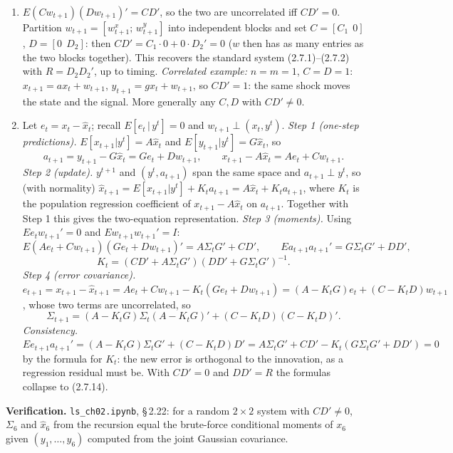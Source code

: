 \documentclass[12pt, letterpaper]{article}
\newcommand{\nb}[1]{\texttt{ls\_ch02.ipynb}, \S\,#1}
\begin{document}
\begin{tcolorbox}[evenbox,title={Exercise 2.22 \quad Kalman Filter with Cross-Products}]
\begin{enumerate}
\item $E(Cw_{t+1})(Dw_{t+1})'=CD'$, so the two are uncorrelated iff $CD'=0$. Partition
$w_{t+1}=[w^x_{t+1};\,w^y_{t+1}]$ into independent blocks and set $C=[C_1\ \ 0]$, $D=[0\ \ D_2]$: then
$CD'=C_1\cdot0+0\cdot D_2'=0$ ($w$ then has as many entries as the two blocks together). This
recovers the standard system (2.7.1)--(2.7.2) with $R=D_2D_2'$, up to timing.
\emph{Correlated example:} $n=m=1$, $C=D=1$: $x_{t+1}=ax_t+w_{t+1}$, $y_{t+1}=gx_t+w_{t+1}$, so
$CD'=1$: the same shock moves the state and the signal. More generally any $C,D$ with $CD'\neq0$.
\item Let $e_t=x_t-\hat x_t$; recall $E[e_t\,|\,y^t]=0$ and $w_{t+1}\perp(x_t,y^t)$.
\emph{Step 1 (one-step predictions).} $E[x_{t+1}|y^t]=A\hat x_t$ and $E[y_{t+1}|y^t]=G\hat x_t$, so
\[
a_{t+1}=y_{t+1}-G\hat x_t=Ge_t+Dw_{t+1},\qquad x_{t+1}-A\hat x_t=Ae_t+Cw_{t+1}.
\]
\emph{Step 2 (update).} $y^{t+1}$ and $(y^t,a_{t+1})$ span the same space and $a_{t+1}\perp y^t$, so
(with normality) $\hat x_{t+1}=E[x_{t+1}|y^t]+K_ta_{t+1}=A\hat x_t+K_ta_{t+1}$, where $K_t$ is the
population regression coefficient of $x_{t+1}-A\hat x_t$ on $a_{t+1}$. Together with Step 1 this gives
the two-equation representation.
\emph{Step 3 (moments).} Using $Ee_tw_{t+1}'=0$ and $Ew_{t+1}w_{t+1}'=I$:
\[
E(Ae_t+Cw_{t+1})(Ge_t+Dw_{t+1})'=A\Sigma_tG'+CD',\qquad
\boxed{Ea_{t+1}a_{t+1}'=G\Sigma_tG'+DD'},
\]
\[
\boxed{K_t=(CD'+A\Sigma_tG')(DD'+G\Sigma_tG')^{-1}}.
\]
\emph{Step 4 (error covariance).} $e_{t+1}=x_{t+1}-\hat x_{t+1}=Ae_t+Cw_{t+1}-K_t(Ge_t+Dw_{t+1})
=(A-K_tG)e_t+(C-K_tD)w_{t+1}$, whose two terms are uncorrelated, so
\[
\boxed{\Sigma_{t+1}=(A-K_tG)\Sigma_t(A-K_tG)'+(C-K_tD)(C-K_tD)'}.
\]
\emph{Consistency.} $Ee_{t+1}a_{t+1}'=(A-K_tG)\Sigma_tG'+(C-K_tD)D'=A\Sigma_tG'+CD'-K_t(G\Sigma_tG'+DD')=0$
by the formula for $K_t$: the new error is orthogonal to the innovation, as a regression residual
must be. With $CD'=0$ and $DD'=R$ the formulas collapse to (2.7.14).
\end{enumerate}

\textbf{Verification.} \nb{2.22}: for a random $2\times2$ system with $CD'\neq0$, $\Sigma_6$ and $\hat x_6$
from the recursion equal the brute-force conditional moments of $x_6$ given $(y_1,\dots,y_6)$ computed
from the joint Gaussian covariance. \checkmark
\end{tcolorbox}
\end{document}
